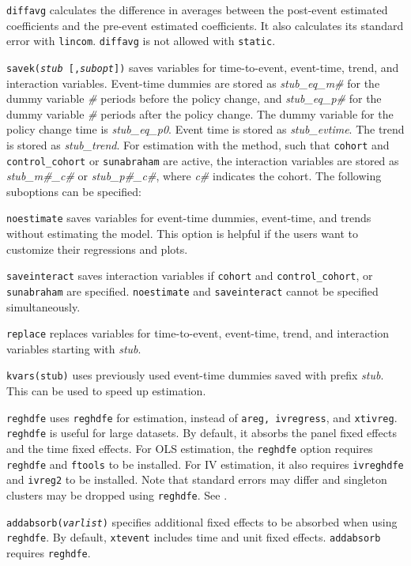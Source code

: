 \documentclass[12pt]{article}
\begin{document}
\hangpara
{\tt diffavg} calculates the difference in averages between the post-event estimated coefficients and the pre-event estimated coefficients.
It also calculates its standard error with {\tt lincom}.
{\tt diffavg} is not allowed with {\tt static}.

\hangpara
{\tt savek({\it stub} [,{\it subopt}])} saves variables for time-to-event, event-time, trend, and interaction variables.
Event-time dummies are stored as {\it stub\_eq\_m\#} for the dummy variable {\it \#} periods before the policy change, and {\it stub\_eq\_p\#} for the dummy variable {\it \#} periods after the policy change.
The dummy variable for the policy change time is {\it stub\_eq\_p0}.
Event time is stored as {\it stub\_evtime}. The trend is stored as {\it stub\_trend}.
For estimation with the \citet{sun2021estimating} method, such that {\tt cohort} and {\tt control\_cohort} or {\tt sunabraham} are active, the interaction variables are stored as {\it stub\_m\#\_c\#} or {\it stub\_p\#\_c\#}, where {\it c\#} indicates the cohort.
The following suboptions can be specified:

\morehangpara
{\tt noestimate} saves variables for event-time dummies, event-time, and trends without estimating the model.
This option is helpful if the users want to customize their regressions and plots.

\morehangpara
{\tt saveinteract} saves interaction variables if {\tt cohort} and {\tt control\_cohort}, or {\tt sunabraham} are specified. {\tt noestimate} and {\tt saveinteract} cannot be specified simultaneously.

\morehangpara
{\tt replace} replaces variables for time-to-event, event-time, trend, and interaction variables starting with \textit{stub}.

\hangpara
{\tt kvars(stub)} uses previously used event-time dummies saved with prefix \textit{stub}. This can be used to speed up estimation.

\hangpara
{\tt reghdfe} uses {\tt reghdfe} for estimation, instead of {\tt areg, ivregress}, and {\tt xtivreg}.
{\tt reghdfe} is useful for large datasets.
By default, it absorbs the panel fixed effects and the time fixed effects.
For OLS estimation, the {\tt reghdfe} option requires {\tt reghdfe} and {\tt ftools} to be installed. For IV estimation, it also requires {\tt ivreghdfe} and {\tt ivreg2} to be installed.
Note that standard errors may differ and singleton clusters may be dropped using {\tt reghdfe}.
See \citet{Correia2017:HDFE}.

\hangpara
{\tt addabsorb({\it varlist})} specifies additional fixed effects to be absorbed when using {\tt reghdfe}.
By default, {\tt xtevent} includes time and unit fixed effects.
{\tt addabsorb} requires {\tt reghdfe}.
\end{document}

